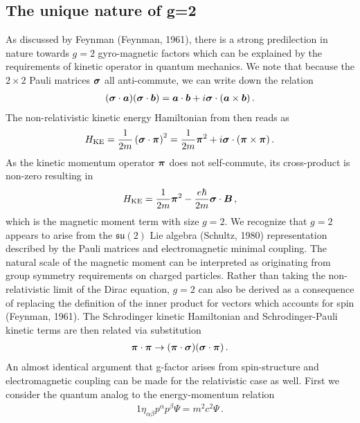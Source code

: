 \subsection{The unique nature of g=2}
\label{sec:unique}
As discussed by Feynman (Feynman, 1961), there is a strong predilection in nature towards $g=2$ gyro-magnetic factors which can be explained by the requirements of kinetic operator in quantum mechanics. We note that because the $2\times2$ Pauli matrices $\boldsymbol{\sigma}$ all anti-commute, we can write down the relation
\begin{alignat}{1}
	\label{nat:1} (\boldsymbol{\sigma}\cdot\boldsymbol{a})(\boldsymbol{\sigma}\cdot\boldsymbol{b})=\boldsymbol{a}\cdot\boldsymbol{b}+i\boldsymbol{\sigma}\cdot(\boldsymbol{a}\times\boldsymbol{b})\,.
\end{alignat}
The non-relativistic kinetic energy Hamiltonian from  then reads as
\begin{alignat}{1}
	\label{nat:2} {H}_{\mathrm{KE}}=\frac{1}{2m}\left(\boldsymbol{\sigma}\cdot\boldsymbol{\pi}\right)^{2}=\frac{1}{2m}\boldsymbol{\pi}^{2}+i\boldsymbol{\sigma}\cdot(\boldsymbol{\pi}\times\boldsymbol{\pi})\,.
\end{alignat}
As the kinetic momentum operator $\boldsymbol{\pi}$ does not self-commute, its cross-product is non-zero resulting in
\begin{alignat}{1}
	\label{nat:3} {H}_{\mathrm{KE}}=\frac{1}{2m}\boldsymbol{\pi}^{2}-\frac{e\hbar}{2m}\boldsymbol{\sigma}\cdot\boldsymbol{B}\,,
\end{alignat}
which is the magnetic moment term with size $g=2$. We recognize that $g=2$ appears to arise from the $\mathfrak{su}(2)$ Lie algebra (Schultz, 1980) representation described by the Pauli matrices and electromagnetic minimal coupling. The natural scale of the magnetic moment can be interpreted as originating from group symmetry requirements on charged particles. Rather than taking the non-relativistic limit of the Dirac equation, $g=2$ can also be derived as a consequence of replacing the definition of the inner product for vectors which accounts for spin (Feynman, 1961). The Schrodinger kinetic Hamiltonian and Schrodinger-Pauli kinetic terms are then related via substitution
\begin{alignat}{1}
	\label{nat:4} \boldsymbol{\pi}\cdot\boldsymbol{\pi} \rightarrow (\boldsymbol{\pi}\cdot\boldsymbol{\sigma})(\boldsymbol{\sigma}\cdot\boldsymbol{\pi})\,.
\end{alignat}
An almost identical argument that g-factor arises from spin-structure and electromagnetic coupling can be made for the relativistic case as well. First we consider the quantum analog to the energy-momentum relation
\begin{alignat}{1}
	\label{analog:1} \eta_{\alpha\beta}p^{\alpha}p^{\beta}\Psi=m^{2}c^{2}\Psi\,.
\end{alignat}
